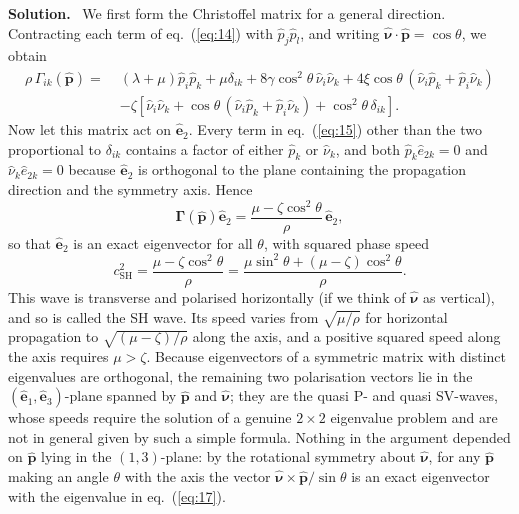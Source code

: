 \documentclass[a4paper,12pt]{paper}
\newenvironment{solution}{\par\noindent\textbf{Solution.}\ }{\par\medskip}
\begin{document}
\begin{solution}
We first form the Christoffel matrix for a general direction. Contracting each term of
eq.~(\ref{eq:14}) with $\hat{p}_{j}\hat{p}_{l}$, and writing
$\hat{\bm{\nu}}\cdot\hat{\mathbf{p}}=\cos\theta$, we obtain
\begin{equation}
\begin{split}
\rho\,\Gamma_{ik}(\hat{\mathbf{p}})=\;&(\lambda+\mu)\hat{p}_{i}\hat{p}_{k}+\mu\delta_{ik}
+8\gamma\cos^{2}\theta\,\hat{\nu}_{i}\hat{\nu}_{k}
+4\xi\cos\theta\,(\hat{\nu}_{i}\hat{p}_{k}+\hat{p}_{i}\hat{\nu}_{k})\\
&-\zeta[\hat{\nu}_{i}\hat{\nu}_{k}+\cos\theta\,(\hat{\nu}_{i}\hat{p}_{k}+\hat{p}_{i}\hat{\nu}_{k})+\cos^{2}\theta\,\delta_{ik}].
\end{split}
\label{eq:15}
\end{equation}
Now let this matrix act on $\hat{\mathbf{e}}_{2}$. Every term in eq.~(\ref{eq:15}) other than
the two proportional to $\delta_{ik}$ contains a factor of either $\hat{p}_{k}$ or
$\hat{\nu}_{k}$, and both $\hat{p}_{k}\hat{e}_{2k}=0$ and $\hat{\nu}_{k}\hat{e}_{2k}=0$ because
$\hat{\mathbf{e}}_{2}$ is orthogonal to the plane containing the propagation direction and
the symmetry axis. Hence
\begin{equation}
\bm{\Gamma}(\hat{\mathbf{p}})\hat{\mathbf{e}}_{2}=\frac{\mu-\zeta\cos^{2}\theta}{\rho}\,\hat{\mathbf{e}}_{2},
\label{eq:16}
\end{equation}
so that $\hat{\mathbf{e}}_{2}$ is an exact eigenvector for all $\theta$, with squared phase speed
\begin{equation}
c_{\mathrm{SH}}^{2}=\frac{\mu-\zeta\cos^{2}\theta}{\rho}=\frac{\mu\sin^{2}\theta+(\mu-\zeta)\cos^{2}\theta}{\rho}.
\label{eq:17}
\end{equation}
This wave is transverse and polarised horizontally (if we think of $\hat{\bm{\nu}}$ as vertical),
and so is called the SH wave. Its speed varies from $\sqrt{\mu/\rho}$ for horizontal propagation to
$\sqrt{(\mu-\zeta)/\rho}$ along the axis, and a positive squared speed along the axis requires
$\mu>\zeta$. Because eigenvectors of a symmetric matrix with distinct eigenvalues are
orthogonal, the remaining two polarisation vectors lie in the $(\hat{\mathbf{e}}_{1},\hat{\mathbf{e}}_{3})$-plane spanned by $\hat{\mathbf{p}}$ and $\hat{\bm{\nu}}$; they are the quasi P- and
quasi SV-waves, whose speeds require the solution of a genuine $2\times2$ eigenvalue problem
and are not in general given by such a simple formula. Nothing in the argument depended on
$\hat{\mathbf{p}}$ lying in the $(1,3)$-plane: by the rotational symmetry about
$\hat{\bm{\nu}}$, for any $\hat{\mathbf{p}}$ making an angle $\theta$ with the axis the vector
$\hat{\bm{\nu}}\times\hat{\mathbf{p}}/\sin\theta$ is an exact eigenvector with the eigenvalue in
eq.~(\ref{eq:17}).


\end{solution}
\end{document}
